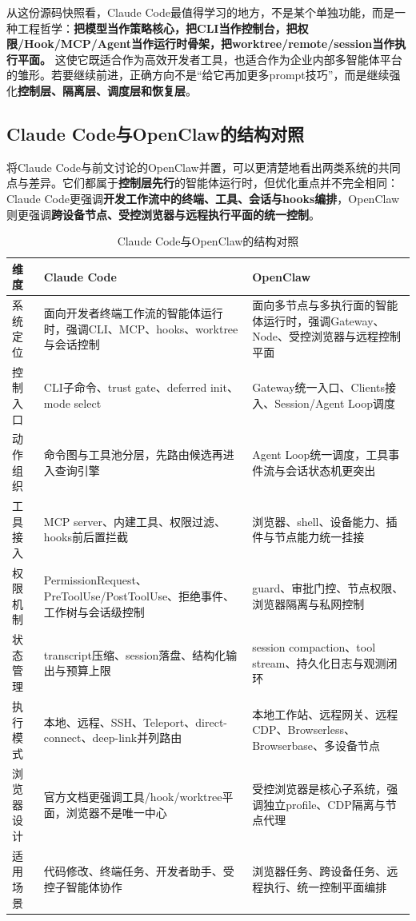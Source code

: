 \documentclass[12pt,a4paper]{article}
\begin{document}
从这份源码快照看，Claude Code最值得学习的地方，不是某个单独功能，而是一种工程哲学：\textbf{把模型当作策略核心，把CLI当作控制台，把权限/Hook/MCP/Agent当作运行时骨架，把worktree/remote/session当作执行平面。} 这使它既适合作为高效开发者工具，也适合作为企业内部多智能体平台的雏形。若要继续前进，正确方向不是“给它再加更多prompt技巧”，而是继续强化\textbf{控制层、隔离层、调度层和恢复层}。

\subsection{Claude Code与OpenClaw的结构对照}

将Claude Code与前文讨论的OpenClaw并置，可以更清楚地看出两类系统的共同点与差异。它们都属于\textbf{控制层先行}的智能体运行时，但优化重点并不完全相同：Claude Code更强调\textbf{开发工作流中的终端、工具、会话与hooks编排}，OpenClaw则更强调\textbf{跨设备节点、受控浏览器与远程执行平面的统一控制}。

\begin{table}[H]
\centering
\caption{Claude Code与OpenClaw的结构对照}
\begin{tabular}{p{2.8cm}p{4.3cm}p{4.3cm}}
\toprule
\textbf{维度} & \textbf{Claude Code} & \textbf{OpenClaw} \\
\midrule
系统定位 & 面向开发者终端工作流的智能体运行时，强调CLI、MCP、hooks、worktree与会话控制 & 面向多节点与多执行面的智能体运行时，强调Gateway、Node、受控浏览器与远程控制平面 \\
控制入口 & CLI子命令、trust gate、deferred init、mode select & Gateway统一入口、Clients接入、Session/Agent Loop调度 \\
动作组织 & 命令图与工具池分层，先路由候选再进入查询引擎 & Agent Loop统一调度，工具事件流与会话状态机更突出 \\
工具接入 & MCP server、内建工具、权限过滤、hooks前后置拦截 & 浏览器、shell、设备能力、插件与节点能力统一挂接 \\
权限机制 & PermissionRequest、PreToolUse/PostToolUse、拒绝事件、工作树与会话级控制 & guard、审批门控、节点权限、浏览器隔离与私网控制 \\
状态管理 & transcript压缩、session落盘、结构化输出与预算上限 & session compaction、tool stream、持久化日志与观测闭环 \\
执行模式 & 本地、远程、SSH、Teleport、direct-connect、deep-link并列路由 & 本地工作站、远程网关、远程CDP、Browserless、Browserbase、多设备节点 \\
浏览器设计 & 官方文档更强调工具/hook/worktree平面，浏览器不是唯一中心 & 受控浏览器是核心子系统，强调独立profile、CDP隔离与节点代理 \\
适用场景 & 代码修改、终端任务、开发者助手、受控子智能体协作 & 浏览器任务、跨设备任务、远程执行、统一控制平面编排 \\
\bottomrule
\end{tabular}
\end{table}
\end{document}
